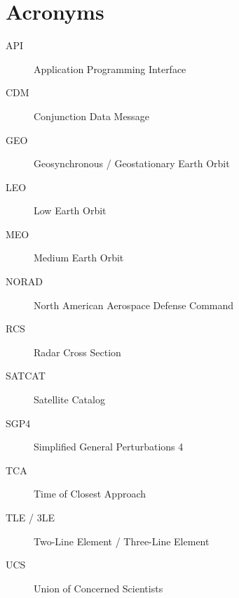 \section*{Acronyms} 
\begin{description}
    \item[API] Application Programming Interface
    \item[CDM] Conjunction Data Message
    \item[GEO] Geosynchronous / Geostationary Earth Orbit
    \item[LEO] Low Earth Orbit
    \item[MEO] Medium Earth Orbit
    \item[NORAD] North American Aerospace Defense Command
    \item[RCS] Radar Cross Section
    \item[SATCAT] Satellite Catalog
    \item[SGP4] Simplified General Perturbations 4
    \item[TCA] Time of Closest Approach
    \item[TLE / 3LE] Two-Line Element / Three-Line Element
    \item[UCS] Union of Concerned Scientists
\end{description}